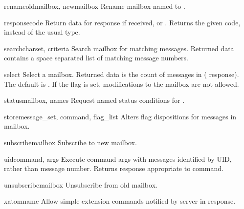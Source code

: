 \begin{methoddesc}{rename}{oldmailbox, newmailbox}
  Rename mailbox named  to .
\end{methoddesc}

\begin{methoddesc}{response}{code}
  Return data for response  if received, or
  . Returns the given code, instead of the usual type.
\end{methoddesc}

\begin{methoddesc}{search}{charset, criteria}
  Search mailbox for matching messages. Returned data contains a space
  separated list of matching message numbers.
\end{methoddesc}

\begin{methoddesc}{select}{}
  Select a mailbox. Returned data is the count of messages in
   ( response).  The default 
  is .  If the  flag is set, modifications
  to the mailbox are not allowed.
\end{methoddesc}

\begin{methoddesc}{status}{mailbox, names}
  Request named status conditions for . 
\end{methoddesc}

\begin{methoddesc}{store}{message_set, command, flag_list}
  Alters flag dispositions for messages in mailbox.
\end{methoddesc}

\begin{methoddesc}{subscribe}{mailbox}
  Subscribe to new mailbox.
\end{methoddesc}

\begin{methoddesc}{uid}{command, args}
  Execute command args with messages identified by UID, rather than
  message number. Returns response appropriate to command.
\end{methoddesc}

\begin{methoddesc}{unsubscribe}{mailbox}
  Unsubscribe from old mailbox.
\end{methoddesc}

\begin{methoddesc}{xatom}{name}
  Allow simple extension commands notified by server in
   response.
\end{methoddesc}


